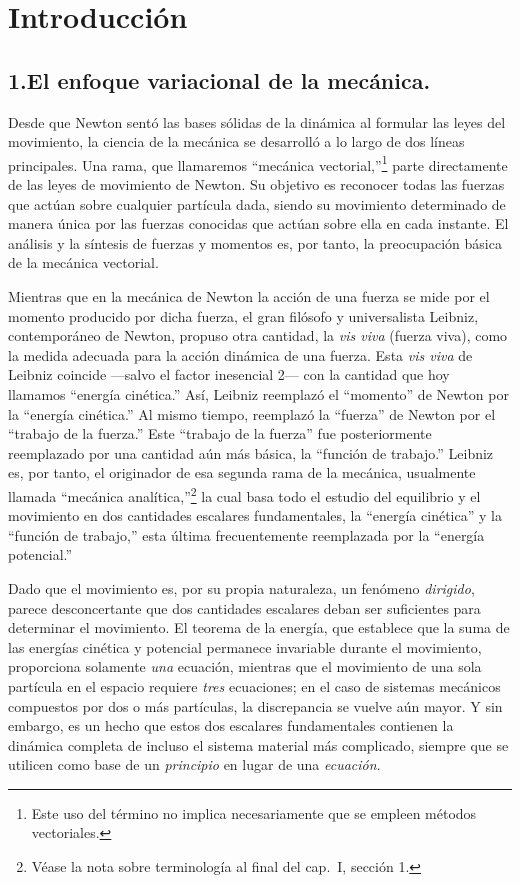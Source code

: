\chapter*{Introducción}

\section*{1.\quad El enfoque variacional de la mecánica.}

Desde que Newton sentó las bases sólidas de la dinámica al formular las leyes del movimiento, la ciencia de la mecánica se desarrolló a lo largo de dos líneas principales. Una rama, que llamaremos ``mecánica vectorial,''\footnote{Este uso del término no implica necesariamente que se empleen métodos vectoriales.} parte directamente de las leyes de movimiento de Newton. Su objetivo es reconocer todas las fuerzas que actúan sobre cualquier partícula dada, siendo su movimiento determinado de manera única por las fuerzas conocidas que actúan sobre ella en cada instante. El análisis y la síntesis de fuerzas y momentos es, por tanto, la preocupación básica de la mecánica vectorial.

Mientras que en la mecánica de Newton la acción de una fuerza se mide por el momento producido por dicha fuerza, el gran filósofo y universalista Leibniz, contemporáneo de Newton, propuso otra cantidad, la \textit{vis viva} (fuerza viva), como la medida adecuada para la acción dinámica de una fuerza. Esta \textit{vis viva} de Leibniz coincide ---salvo el factor inesencial 2--- con la cantidad que hoy llamamos ``energía cinética.'' Así, Leibniz reemplazó el ``momento'' de Newton por la ``energía cinética.'' Al mismo tiempo, reemplazó la ``fuerza'' de Newton por el ``trabajo de la fuerza.'' Este ``trabajo de la fuerza'' fue posteriormente reemplazado por una cantidad aún más básica, la ``función de trabajo.'' Leibniz es, por tanto, el originador de esa segunda rama de la mecánica, usualmente llamada ``mecánica analítica,''\footnote{Véase la nota sobre terminología al final del cap.\ I, sección 1.} la cual basa todo el estudio del equilibrio y el movimiento en dos cantidades escalares fundamentales, la ``energía cinética'' y la ``función de trabajo,'' esta última frecuentemente reemplazada por la ``energía potencial.''

Dado que el movimiento es, por su propia naturaleza, un fenómeno \textit{dirigido}, parece desconcertante que dos cantidades escalares deban ser suficientes para determinar el movimiento. El teorema de la energía, que establece que la suma de las energías cinética y potencial permanece invariable durante el movimiento, proporciona solamente \textit{una} ecuación, mientras que el movimiento de una sola partícula en el espacio requiere \textit{tres} ecuaciones; en el caso de sistemas mecánicos compuestos por dos o más partículas, la discrepancia se vuelve aún mayor. Y sin embargo, es un hecho que estos dos escalares fundamentales contienen la dinámica completa de incluso el sistema material más complicado, siempre que se utilicen como base de un \textit{principio} en lugar de una \textit{ecuación}.

